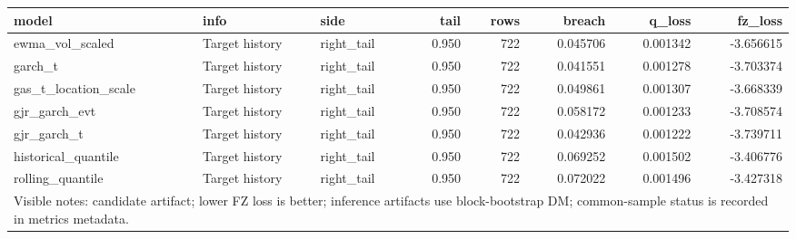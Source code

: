 \begin{tabular}{lllrrrrr}
\toprule
model & info & side & tail & rows & breach & q_loss & fz_loss \\
\midrule
ewma\_vol\_scaled & Target history & right\_tail & 0.950 & 722 & 0.045706 & 0.001342 & -3.656615 \\
garch\_t & Target history & right\_tail & 0.950 & 722 & 0.041551 & 0.001278 & -3.703374 \\
gas\_t\_location\_scale & Target history & right\_tail & 0.950 & 722 & 0.049861 & 0.001307 & -3.668339 \\
gjr\_garch\_evt & Target history & right\_tail & 0.950 & 722 & 0.058172 & 0.001233 & -3.708574 \\
gjr\_garch\_t & Target history & right\_tail & 0.950 & 722 & 0.042936 & 0.001222 & -3.739711 \\
historical\_quantile & Target history & right\_tail & 0.950 & 722 & 0.069252 & 0.001502 & -3.406776 \\
rolling\_quantile & Target history & right\_tail & 0.950 & 722 & 0.072022 & 0.001496 & -3.427318 \\
\midrule
\multicolumn{8}{l}{\footnotesize Visible notes: candidate artifact; lower FZ loss is better; inference artifacts use block-bootstrap DM; common-sample status is recorded in metrics metadata.} \\
\bottomrule
\end{tabular}
